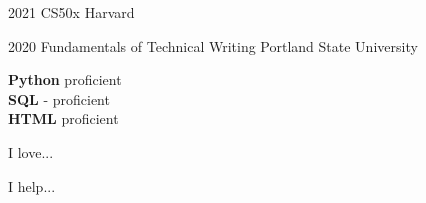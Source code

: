\documentclass[9pt]{developercv} %
\begin{document}

\begin{entrylist}
	\entry
		{2021}
		{CS50x}
		{Harvard}
		
	\entry
		{2020}
		{Fundamentals of Technical Writing}
		{Portland State University}
		
\end{entrylist}


\begin{minipage}[t]{0.3\textwidth}
	\vspace{-\baselineskip} %

	
	\textbf{Python}  proficient\\
	\textbf{SQL} - proficient\\
	\textbf{HTML}  proficient\\
\end{minipage}
\hfill
\begin{minipage}[t]{0.3\textwidth}
	\vspace{-\baselineskip} %
	
	
	I love... \lorem
\end{minipage}
\hfill
\begin{minipage}[t]{0.3\textwidth}
	\vspace{-\baselineskip} %
	
	
	I help... \lorem
\end{minipage}

\end{document}

